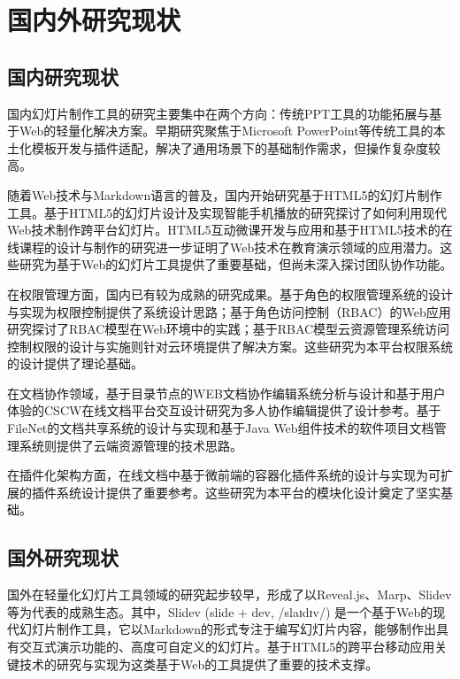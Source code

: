 \section{国内外研究现状}
\subsection{国内研究现状}
国内幻灯片制作工具的研究主要集中在两个方向：传统PPT工具的功能拓展与基于Web的轻量化解决方案。早期研究聚焦于Microsoft PowerPoint等传统工具的本土化模板开发与插件适配，解决了通用场景下的基础制作需求，但操作复杂度较高。

随着Web技术与Markdown语言的普及，国内开始研究基于HTML5的幻灯片制作工具。基于HTML5的幻灯片设计及实现智能手机播放的研究\cite{HLJK201802015}探讨了如何利用现代Web技术制作跨平台幻灯片。HTML5互动微课开发与应用\cite{ZJGZ201603011}和基于HTML5技术的在线课程的设计与制作\cite{XXDL201613117}的研究进一步证明了Web技术在教育演示领域的应用潜力。这些研究为基于Web的幻灯片工具提供了重要基础，但尚未深入探讨团队协作功能。

在权限管理方面，国内已有较为成熟的研究成果。基于角色的权限管理系统的设计与实现\cite{zhang2013rbac}为权限控制提供了系统设计思路；基于角色访问控制（RBAC）的Web应用研究\cite{wu2002rbacweb}探讨了RBAC模型在Web环境中的实践；基于RBAC模型云资源管理系统访问控制权限的设计与实施\cite{wei2025rbaccloud}则针对云环境提供了解决方案。这些研究为本平台权限系统的设计提供了理论基础。

在文档协作领域，基于目录节点的WEB文档协作编辑系统分析与设计\cite{tan2012web}和基于用户体验的CSCW在线文档平台交互设计研究\cite{li2020cscw}为多人协作编辑提供了设计参考。基于FileNet的文档共享系统的设计与实现\cite{li2015filenet}和基于Java Web组件技术的软件项目文档管理系统\cite{zhang2024javaweb}则提供了云端资源管理的技术思路。

在插件化架构方面，在线文档中基于微前端的容器化插件系统的设计与实现\cite{cai2022microfrontend}为可扩展的插件系统设计提供了重要参考。这些研究为本平台的模块化设计奠定了坚实基础。

\subsection{国外研究现状}
国外在轻量化幻灯片工具领域的研究起步较早，形成了以Reveal.js、Marp、Slidev等为代表的成熟生态。其中，Slidev (slide + dev, /slaɪdɪv/) 是一个基于Web的现代幻灯片制作工具，它以Markdown的形式专注于编写幻灯片内容，能够制作出具有交互式演示功能的、高度可自定义的幻灯片。基于HTML5的跨平台移动应用关键技术的研究与实现\cite{GYKJ201303028}为这类基于Web的工具提供了重要的技术支撑。

